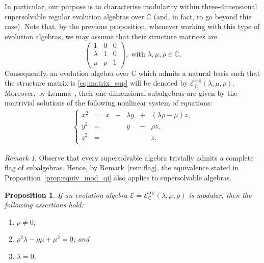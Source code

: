 \documentclass[12pt,reqno]{amsart}
\theoremstyle{plain}%
\newtheorem{proposition}[theorem]{Proposition}%
\theoremstyle{definition}
\theoremstyle{remark}
\newtheorem{remark}[theorem]{Remark}
\newcommand{\E}{\mathcal{E}}
\numberwithin{equation}{section}
\begin{document}
In particular, our purpose is to characterise modularity within three-dimensional supersolvable regular evolution algebras over $\mathbb{C}$ (and, in fact, to go beyond this case). Note that, by the previous proposition, whenever working with this type of evolution algebras, we may assume that their structure matrices are
\begin{equation}\label{eq:matrix_sup}
	\begin{pmatrix}
		1 & 0 & 0\\
		\lambda & 1 & 0\\
		\mu & \rho & 1
	\end{pmatrix},\text{ with }\lambda, \mu,\rho\in\mathbb{C}.
\end{equation}
Consequently, an evolution algebra over $\mathbb{C}$ which admits a natural basis such that the structure matrix is \eqref{eq:matrix_sup} will be denoted by $\mathcal{E}_\mathbb{C}^{\mathrm{reg}}(\lambda,\mu,\rho)$. Moreover, by Lemma~\cite[Lemma~1]{LP_25_regular}, their one-dimensional subalgebras are given by the nontrivial solutions of the following nonlinear system of equations:
\begin{align}\label{eq:sist_supersoluble}
	\left\{
		\begin{array}{ccccccc}
			x^2&=&x&-&\lambda y&+&(\lambda\rho-\mu)z,\\
			y^2&=&&&y&-&\rho z,\\
			z^2&=&&&&&z.\\
		\end{array}
		\right.
\end{align}
\begin{remark}\label{rem:qi_super}
	Observe that every supersolvable algebra trivially admits a complete flag of subalgebras. Hence, by Remark~\ref{rem:flag}, the equivalence stated in Proposition~\ref{prop:equiv_mod_qi} also applies to supersolvable algebras.
\end{remark}
\begin{proposition}\label{prop:cond_mod}
	If an evolution algebra 
	$\E=\mathcal{E}_\mathbb{C}^{\mathrm{reg}}(\lambda,\mu,\rho)$ is modular, then the following assertions hold:
\begin{enumerate}[\rm (i)]
\item $\rho\neq0$;
\item $\rho^2\lambda-\rho\mu+\mu^2=0$; and 
\item $\lambda=0$.
\end{enumerate}
\end{proposition}
\end{document}

